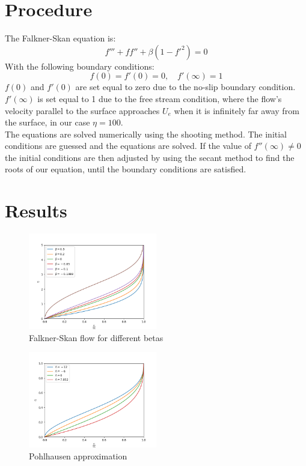 \documentclass[conf]{new-aiaa}
\begin{document}
\section{Procedure}
The Falkner-Skan equation is:
\begin{equation}
    f'''+ff''+\beta(1-f'^2)=0
\end{equation}
With the following boundary conditions:
\begin{equation}
    f(0)=f'(0)=0, \quad f'(\infty)=1
\end{equation}
$f(0)$ and $f'(0)$ are set equal to zero due to the no-slip boundary condition. $f'(\infty)$ is set equal to 1 due to the free stream condition, where the flow's velocity parallel to the surface approaches $U_e$ when it is infinitely far away from the surface, in our case $\eta=100$. \\
The equations are solved numerically using the shooting method. The initial conditions are guessed and the equations are solved. If the value of $f''(\infty)\neq 0$ the initial conditions are then adjusted by using the secant method to find the roots of our equation, until the boundary conditions are satisfied. \\
\section{Results}
\begin{figure}[H]
    \centering
    \includegraphics[width=0.5\textwidth]{Project 2.png}
    \caption{Falkner-Skan flow for different betas}
    \label{fig:Falkner-Skan for different betas}
\end{figure}

\begin{figure}[H]
    \centering
    \includegraphics[width=0.5\textwidth]{Pohlhausen.png}
    \caption{Pohlhausen approximation}
    \label{fig:Falkner-Skan}
\end{figure}
\end{document}
